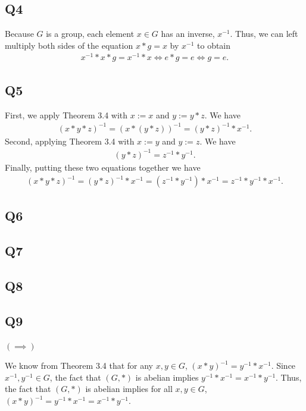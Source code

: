 \documentclass[12pt]{article}
\numberwithin{theorem}{section}
\numberwithin{equation}{section}
\numberwithin{remark}{section}
\numberwithin{definition}{section}
\numberwithin{theorem}{section}
\numberwithin{lemma}{section}
\numberwithin{example}{section}
\begin{document}
\subsection{Q4}

Because $G$ is a group, each element $x\in G$ has an inverse, $x^{-1}$. Thus, we can left multiply both sides of the equation $x*g=x$ by $x^{-1}$ to obtain 
\begin{align*}
	x^{-1}*x*g=x^{-1}*x\iff e*g=e \iff g = e. 
\end{align*}



\subsection{Q5}

First, we apply Theorem 3.4 with $x:=x$ and $y:=y*z$. We have
\begin{align*}
	\left(x*y*z\right)^{-1}=\left(x*(y*z)\right)^{-1}=\left(y*z\right)^{-1}*x^{-1}.
\end{align*}
Second, applying Theorem 3.4 with $x:=y$ and $y:=z$. We have
\begin{align*}
	\left(y*z\right)^{-1}=z^{-1}*y^{-1}.
\end{align*}
Finally, putting these two equations together we have
\begin{align*}
	\left(x*y*z\right)^{-1}=\left(y*z\right)^{-1}*x^{-1}=\left(z^{-1}*y^{-1}\right)*x^{-1}=z^{-1}*y^{-1}*x^{-1}.
\end{align*}



\subsection{Q6}

\subsection{Q7}

\subsection{Q8}

\subsection{Q9}

$\left(\implies\right)$ 

We know from Theorem 3.4 that for any $x,y\in G$, $\left(x*y\right)^{-1}=y^{-1}*x^{-1}$. Since $x^{-1},y^{-1}\in G$, the fact that $(G,*)$ is abelian implies $y^{-1}*x^{-1}=x^{-1}*y^{-1}$. Thus, the fact that $(G,*)$ is abelian implies for all $x,y\in G$, $\left(x*y\right)^{-1}=y^{-1}*x^{-1}=x^{-1}*y^{-1}.$
\end{document}
